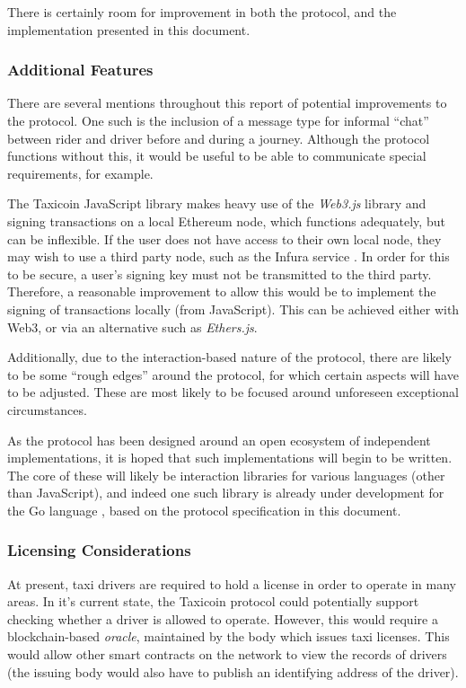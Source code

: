 There is certainly room for improvement in both the protocol, and the implementation presented in this document.

\subsubsection{Additional Features}

There are several mentions throughout this report of potential improvements to the protocol. One such is the inclusion of a message type for informal \enquote{chat} between rider and driver before and during a journey. Although the protocol functions without this, it would be useful to be able to communicate special requirements, for example.

The Taxicoin JavaScript library makes heavy use of the \textit{Web3.js} library and signing transactions on a local Ethereum node, which functions adequately, but can be inflexible. If the user does not have access to their own local node, they may wish to use a third party node, such as the Infura service \cite{Infura}. In order for this to be secure, a user's signing key must not be transmitted to the third party. Therefore, a reasonable improvement to allow this would be to implement the signing of transactions locally (from JavaScript). This can be achieved either with Web3, or via an alternative such as \textit{Ethers.js}.

Additionally, due to the interaction-based nature of the protocol, there are likely to be some \enquote{rough edges} around the protocol, for which certain aspects will have to be adjusted. These are most likely to be focused around unforeseen exceptional circumstances.

As the protocol has been designed around an open ecosystem of independent implementations, it is hoped that such implementations will begin to be written. The core of these will likely be interaction libraries for various languages (other than JavaScript), and indeed one such library is already under development for the Go language \cite{TaxicoinGo}, based on the protocol specification in this document.

\subsubsection{Licensing Considerations}

At present, taxi drivers are required to hold a license in order to operate in many areas. In it's current state, the Taxicoin protocol could potentially support checking whether a driver is allowed to operate. However, this would require a blockchain-based \textit{oracle}, maintained by the body which issues taxi licenses. This would allow other smart contracts on the network to view the records of drivers (the issuing body would also have to publish an identifying address of the driver).

